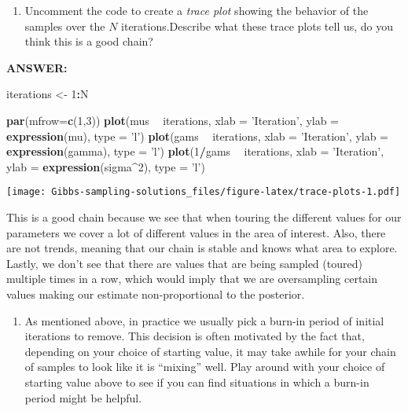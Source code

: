 \documentclass[
]{article}
\newenvironment{Shaded}{\begin{snugshade}}{\end{snugshade}}
\newcommand{\DataTypeTok}[1]{\textcolor[rgb]{0.13,0.29,0.53}{#1}}
\newcommand{\DecValTok}[1]{\textcolor[rgb]{0.00,0.00,0.81}{#1}}
\newcommand{\KeywordTok}[1]{\textcolor[rgb]{0.13,0.29,0.53}{\textbf{#1}}}
\newcommand{\NormalTok}[1]{#1}
\newcommand{\OperatorTok}[1]{\textcolor[rgb]{0.81,0.36,0.00}{\textbf{#1}}}
\newcommand{\StringTok}[1]{\textcolor[rgb]{0.31,0.60,0.02}{#1}}
\providecommand{\tightlist}{%
  \setlength{\itemsep}{0pt}\setlength{\parskip}{0pt}}
\begin{document}
\begin{enumerate}
\def\labelenumi{\arabic{enumi}.}
\setcounter{enumi}{6}
\tightlist
\item
  Uncomment the code to create a \emph{trace plot} showing the behavior
  of the samples over the \(N\) iterations.Describe what these trace
  plots tell us, do you think this is a good chain?
\end{enumerate}

\textbf{ANSWER:}

\begin{Shaded}
\begin{Highlighting}[]
\NormalTok{iterations <-}\StringTok{ }\DecValTok{1}\OperatorTok{:}\NormalTok{N}

\KeywordTok{par}\NormalTok{(}\DataTypeTok{mfrow=}\KeywordTok{c}\NormalTok{(}\DecValTok{1}\NormalTok{,}\DecValTok{3}\NormalTok{))}
\KeywordTok{plot}\NormalTok{(mus }\OperatorTok{~}\StringTok{ }\NormalTok{iterations, }\DataTypeTok{xlab =} \StringTok{'Iteration'}\NormalTok{, }\DataTypeTok{ylab =} \KeywordTok{expression}\NormalTok{(mu), }\DataTypeTok{type =} \StringTok{'l'}\NormalTok{)}
\KeywordTok{plot}\NormalTok{(gams }\OperatorTok{~}\StringTok{ }\NormalTok{iterations, }\DataTypeTok{xlab =} \StringTok{'Iteration'}\NormalTok{, }\DataTypeTok{ylab =} \KeywordTok{expression}\NormalTok{(gamma), }\DataTypeTok{type =} \StringTok{'l'}\NormalTok{)}
\KeywordTok{plot}\NormalTok{(}\DecValTok{1}\OperatorTok{/}\NormalTok{gams }\OperatorTok{~}\StringTok{ }\NormalTok{iterations, }\DataTypeTok{xlab =} \StringTok{'Iteration'}\NormalTok{, }\DataTypeTok{ylab =} \KeywordTok{expression}\NormalTok{(sigma}\OperatorTok{^}\DecValTok{2}\NormalTok{), }\DataTypeTok{type =} \StringTok{'l'}\NormalTok{)}
\end{Highlighting}
\end{Shaded}

\texttt{[image: Gibbs-sampling-solutions\_files/figure-latex/trace-plots-1.pdf]}

This is a good chain because we see that when touring the different
values for our parameters we cover a lot of different values in the area
of interest. Also, there are not trends, meaning that our chain is
stable and knows what area to explore. Lastly, we don't see that there
are values that are being sampled (toured) multiple times in a row,
which would imply that we are oversampling certain values making our
estimate non-proportional to the posterior.

\begin{enumerate}
\def\labelenumi{\arabic{enumi}.}
\setcounter{enumi}{7}
\tightlist
\item
  As mentioned above, in practice we usually pick a burn-in period of
  initial iterations to remove. This decision is often motivated by the
  fact that, depending on your choice of starting value, it may take
  awhile for your chain of samples to look like it is ``mixing'' well.
  Play around with your choice of starting value above to see if you can
  find situations in which a burn-in period might be helpful.
\end{enumerate}
\end{document}
